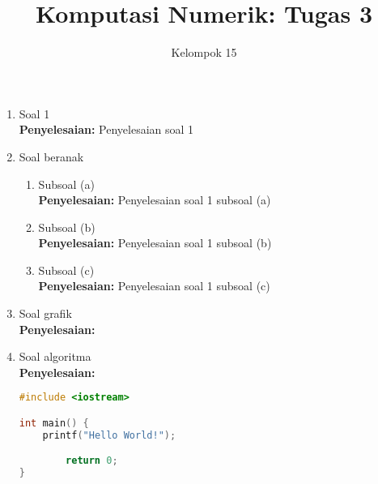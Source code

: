 \documentclass{article}
\title{\textbf{Komputasi Numerik: Tugas 3}}
\author{Kelompok 15}
\date{}
\newcommand{\penyelesaian}{\textbf{Penyelesaian: }}
\begin{document}
\maketitle

\begin{enumerate}
    \item Soal 1 \\
    \penyelesaian Penyelesaian soal 1

    \item Soal beranak
    \begin{enumerate}
        \item Subsoal (a) \\
        \penyelesaian Penyelesaian soal 1 subsoal (a)

        \item Subsoal (b) \\
        \penyelesaian Penyelesaian soal 1 subsoal (b)

        \item Subsoal (c) \\
        \penyelesaian  Penyelesaian soal 1 subsoal (c)
    \end{enumerate}

    \item Soal grafik \\
    \penyelesaian \\
    \begin{center}
    \end{center}

    \item Soal algoritma \\
    \penyelesaian
    \begin{lstlisting}[style=code,language=c]
#include <iostream>

int main() {
    printf("Hello World!");

        return 0;
}
    \end{lstlisting}
\end{enumerate}
\end{document}
